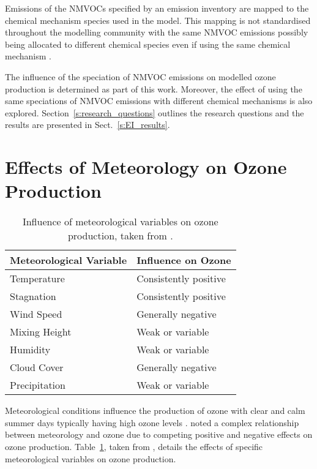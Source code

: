 Emissions of the NMVOCs specified by an emission inventory are mapped to the chemical mechanism species used in the model.
This mapping is not standardised throughout the modelling community with the same NMVOC emissions possibly being allocated to different chemical species even if using the same chemical mechanism \citep{Carter:2015}.

The influence of the speciation of NMVOC emissions on modelled ozone production is determined as part of this work.
Moreover, the effect of using the same speciations of NMVOC emissions with different chemical mechanisms is also explored.
Section~\ref{s:research_questions} outlines the research questions and the results are presented in Sect.~\ref{s:EI_results}.

\section{Effects of Meteorology on Ozone Production} \label{s:meteo_ozone}
\begin{table}%
    \centering%
    \caption[Influence of meteorological variables on ozone production]{Influence of meteorological variables on ozone production, taken from \citet{Jacob:2009}.}%
    \begin{tabular}{ll}%
        \hline \hline
        \textbf{Meteorological Variable} & \textbf{Influence on Ozone} \\
        \hline \hline
        Temperature & Consistently positive \\
        Stagnation & Consistently positive \\
        Wind Speed & Generally negative \\
        Mixing Height & Weak or variable \\
        Humidity & Weak or variable \\
        Cloud Cover & Generally negative \\
        Precipitation & Weak or variable \\
        \hline \hline
    \end{tabular}%
    \label{t:meteo_vars}%
\end{table}%
Meteorological conditions influence the production of ozone with clear and calm summer days typically having high ozone levels \citep{Duenas:2002}.
\citet{Comrie:1997} noted a complex relationship between meteorology and ozone due to competing positive and negative effects on ozone production.
Table~\ref{t:meteo_vars}, taken from \citet{Jacob:2009}, details the effects of specific meteorological variables on ozone production.

